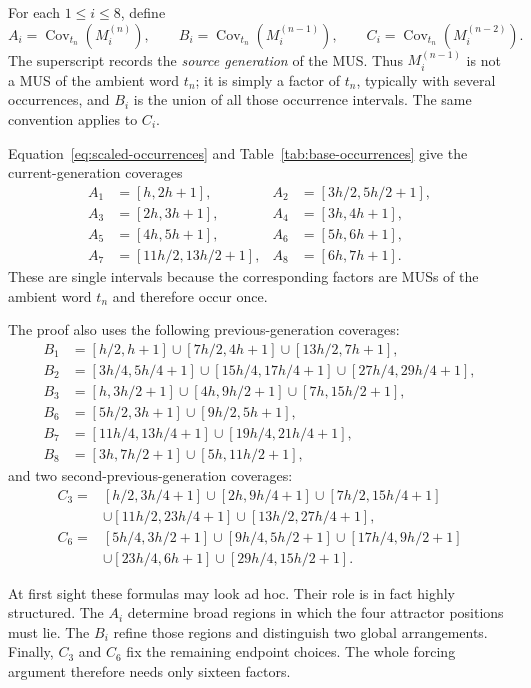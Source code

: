 \documentclass[10pt,a4paper]{article}
\theoremstyle{definition}\newtheorem{definition}[theorem]{Definition}
\theoremstyle{remark}\newtheorem{remark}[theorem]{Remark}
\newcommand{\Cov}{\operatorname{Cov}}
\begin{document}
For each $1\le i\le8$, define
\[
 A_i=\Cov_{t_n}(M_i^{(n)}),\qquad
 B_i=\Cov_{t_n}(M_i^{(n-1)}),\qquad
 C_i=\Cov_{t_n}(M_i^{(n-2)}).
\]
The superscript records the \emph{source generation} of the MUS.  Thus $M_i^{(n-1)}$ is not a MUS of the ambient word $t_n$; it is simply a factor of $t_n$, typically with several occurrences, and $B_i$ is the union of all those occurrence intervals.  The same convention applies to $C_i$.

Equation~\eqref{eq:scaled-occurrences} and Table~\ref{tab:base-occurrences} give the current-generation coverages
\begin{align*}
A_1&=[h,2h+1], & A_2&=[3h/2,5h/2+1],\\
A_3&=[2h,3h+1], & A_4&=[3h,4h+1],\\
A_5&=[4h,5h+1], & A_6&=[5h,6h+1],\\
A_7&=[11h/2,13h/2+1], & A_8&=[6h,7h+1].
\end{align*}
These are single intervals because the corresponding factors are MUSs of the ambient word $t_n$ and therefore occur once.

The proof also uses the following previous-generation coverages:
\begin{align*}
B_1&=[h/2,h+1]\cup[7h/2,4h+1]\cup[13h/2,7h+1],\\
B_2&=[3h/4,5h/4+1]\cup[15h/4,17h/4+1]\cup[27h/4,29h/4+1],\\
B_3&=[h,3h/2+1]\cup[4h,9h/2+1]\cup[7h,15h/2+1],\\
B_6&=[5h/2,3h+1]\cup[9h/2,5h+1],\\
B_7&=[11h/4,13h/4+1]\cup[19h/4,21h/4+1],\\
B_8&=[3h,7h/2+1]\cup[5h,11h/2+1],
\end{align*}
and two second-previous-generation coverages:
\begin{align*}
C_3={}&[h/2,3h/4+1]\cup[2h,9h/4+1]\cup[7h/2,15h/4+1]\\
&\cup[11h/2,23h/4+1]\cup[13h/2,27h/4+1],\\
C_6={}&[5h/4,3h/2+1]\cup[9h/4,5h/2+1]\cup[17h/4,9h/2+1]\\
&\cup[23h/4,6h+1]\cup[29h/4,15h/2+1].
\end{align*}

At first sight these formulas may look ad hoc.  Their role is in fact highly structured.  The $A_i$ determine broad regions in which the four attractor positions must lie.  The $B_i$ refine those regions and distinguish two global arrangements.  Finally, $C_3$ and $C_6$ fix the remaining endpoint choices.  The whole forcing argument therefore needs only sixteen factors.
\end{document}
